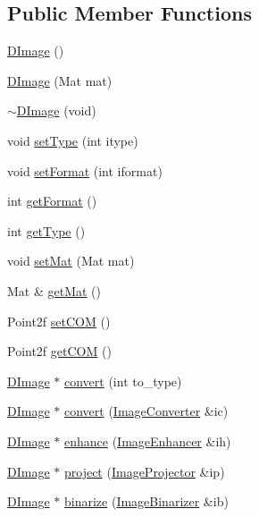 \subsection*{Public Member Functions}
\begin{DoxyCompactItemize}
\item 
\hyperlink{class_d_image_ab276c7e2458e697fbff3366a27f9bf93}{D\+Image} ()
\item 
\hyperlink{class_d_image_a7d7c1b9cf26cf48c81b9d5cd424ab788}{D\+Image} (Mat mat)
\item 
\hyperlink{class_d_image_aa86a9aa92905deb0d8aab5f1298c6b9b}{$\sim$\+D\+Image} (void)
\item 
void \hyperlink{class_d_image_a4c4ee0a9910a21d200a469f945060fbe}{set\+Type} (int itype)
\item 
void \hyperlink{class_d_image_a7673f3ca0b1703a3401e7a953e7464e2}{set\+Format} (int iformat)
\item 
int \hyperlink{class_d_image_a80065ac2ff9eb49a68adde1f24494087}{get\+Format} ()
\item 
int \hyperlink{class_d_image_aad98497ac69ada8d00e14d1aadf11406}{get\+Type} ()
\item 
void \hyperlink{class_d_image_af7605a6d9d5bd6ca117507bd9fd00c2b}{set\+Mat} (Mat mat)
\item 
Mat \& \hyperlink{class_d_image_a1f875d1a50eff52cbd1ca119f5293c8d}{get\+Mat} ()
\item 
Point2f \hyperlink{class_d_image_a8127b81bd1bcafa719c8c39f868a61e8}{set\+C\+O\+M} ()
\item 
Point2f \hyperlink{class_d_image_a391b874fbd441d759a68582c5a1c65ff}{get\+C\+O\+M} ()
\item 
\hyperlink{class_d_image}{D\+Image} $\ast$ \hyperlink{class_d_image_af91df7fb4ff6ee2ff5d040bd5ae4356c}{convert} (int to\+\_\+type)
\item 
\hyperlink{class_d_image}{D\+Image} $\ast$ \hyperlink{class_d_image_abbd42491c1788bab34a871e5674e0ad4}{convert} (\hyperlink{class_image_converter}{Image\+Converter} \&ic)
\item 
\hyperlink{class_d_image}{D\+Image} $\ast$ \hyperlink{class_d_image_a62f8f2c9cd22264f31c94f352c2fb620}{enhance} (\hyperlink{class_image_enhancer}{Image\+Enhancer} \&ih)
\item 
\hyperlink{class_d_image}{D\+Image} $\ast$ \hyperlink{class_d_image_a30853028d3eee069389660a20178e57c}{project} (\hyperlink{class_image_projector}{Image\+Projector} \&ip)
\item 
\hyperlink{class_d_image}{D\+Image} $\ast$ \hyperlink{class_d_image_aabf5c54bbdfdfb7cde2aca18452d5ef1}{binarize} (\hyperlink{class_image_binarizer}{Image\+Binarizer} \&ib)

\end{DoxyCompactItemize}
